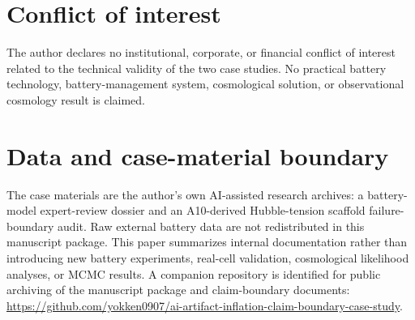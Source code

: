 \documentclass[a4paper,11pt]{article}
\begin{document}
\section*{Conflict of interest}

The author declares no institutional, corporate, or financial conflict of interest related to the technical validity of the two case studies. No practical battery technology, battery-management system, cosmological solution, or observational cosmology result is claimed.

\section*{Data and case-material boundary}

The case materials are the author's own AI-assisted research archives: a battery-model expert-review dossier and an A10-derived Hubble-tension scaffold failure-boundary audit. Raw external battery data are not redistributed in this manuscript package. This paper summarizes internal documentation rather than introducing new battery experiments, real-cell validation, cosmological likelihood analyses, or MCMC results. A companion repository is identified for public archiving of the manuscript package and claim-boundary documents: \url{https://github.com/yokken0907/ai-artifact-inflation-claim-boundary-case-study}.
\end{document}

